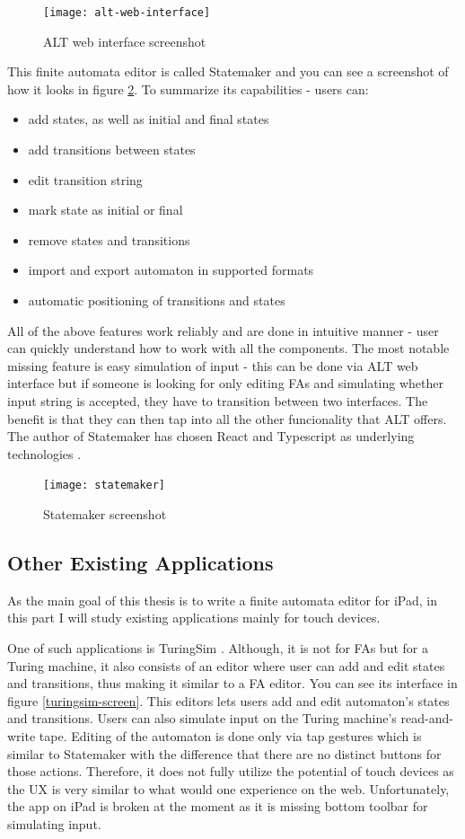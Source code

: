 \begin{figure}
    \texttt{[image: alt-web-interface]}
    \caption{ALT web interface screenshot}\label{alt-web-interface-screen}
\end{figure}

This finite automata editor is called Statemaker and you can see a screenshot of how it looks in figure \ref{statemaker-screen}. To summarize its capabilities - users can:
\begin{itemize}
    \item add states, as well as initial and final states
    \item add transitions between states
    \item edit transition string
    \item mark state as initial or final
    \item remove states and transitions
    \item import and export automaton in supported formats
    \item automatic positioning of transitions and states
\end{itemize}
All of the above features work reliably and are done in intuitive manner - user can quickly understand how to work with all the components. The most notable missing feature is easy simulation of input - this can be done via ALT web interface but if someone is looking for only editing FAs and simulating whether input string is accepted, they have to transition between two interfaces. The benefit is that they can then tap into all the other funcionality that ALT offers. The author of Statemaker has chosen React and Typescript as underlying technologies \cite{state-maker}.

\begin{figure}
    \texttt{[image: statemaker]}
    \caption{Statemaker screenshot}\label{statemaker-screen}
\end{figure}

\subsection{Other Existing Applications}

As the main goal of this thesis is to write a finite automata editor for iPad, in this part I will study existing applications mainly for touch devices. 

One of such applications is TuringSim \cite{turingsim}. Although, it is not for FAs but for a Turing machine, it also consists of an editor where user can add and edit states and transitions, thus making it similar to a FA editor. You can see its interface in figure \ref{turingsim-screen}. This editors lets users add and edit automaton's states and transitions. Users can also simulate input on the Turing machine's read-and-write tape. Editing of the automaton is done only via tap gestures which is similar to Statemaker with the difference that there are no distinct buttons for those actions. Therefore, it does not fully utilize the potential of touch devices as the UX is very similar to what would one experience on the web. Unfortunately, the app on iPad is broken at the moment as it is missing bottom toolbar for simulating input.

